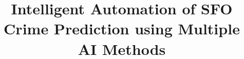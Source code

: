 \documentclass[conference,final,]{IEEEtran}
\begin{document}
%
\title{Intelligent Automation of SFO Crime Prediction using Multiple AI
Methods}


\author{











}


%
\end{document}
